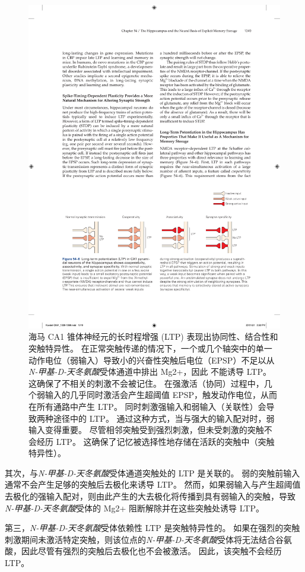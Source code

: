 \begin{figure}[htbp]
	\centering
	\includegraphics[width=0.9\linewidth]{chap54/fig_54_6}
	\caption{海马 CA1 锥体神经元的长时程增强 (LTP) 表现出协同性、结合性和突触特异性。 在正常突触传递的情况下，一个或几个轴突中的单一动作电位（弱输入）导致小的兴奋性突触后电位（EPSP）不足以从\textit{N-甲基-D-天冬氨酸}受体通道中排出 Mg2+，因此 不能诱导 LTP。 这确保了不相关的刺激不会被记住。 在强激活（协同）过程中，几个弱输入的几乎同时激活会产生超阈值 EPSP，触发动作电位，从而在所有通路中产生 LTP。 同时刺激强输入和弱输入（关联性）会导致两种途径中的 LTP。 通过这种方式，当与强大的输入配对时，弱输入变得重要。 尽管相邻突触受到强烈刺激，但未受刺激的突触不会经历 LTP。 这确保了记忆被选择性地存储在活跃的突触中（突触特异性）。}
	\label{fig:54_6}
\end{figure}


其次，与\textit{N-甲基-D-天冬氨酸}受体通道突触处的 LTP 是关联的。
弱的突触前输入通常不会产生足够的突触后去极化来诱导 LTP。
然而，如果弱输入与产生超阈值去极化的强输入配对，则由此产生的大去极化将传播到具有弱输入的突触，导致\textit{N-甲基-D-天冬氨酸}受体的 Mg2+ 阻断解除并在这些突触处诱导 LTP。


第三，\textit{N-甲基-D-天冬氨酸}受体依赖性 LTP 是突触特异性的。
如果在强烈的突触刺激期间未激活特定突触，则该位点的\textit{N-甲基-D-天冬氨酸}受体将无法结合谷氨酸，因此尽管有强烈的突触后去极化也不会被激活。
因此，该突触不会经历 LTP。


